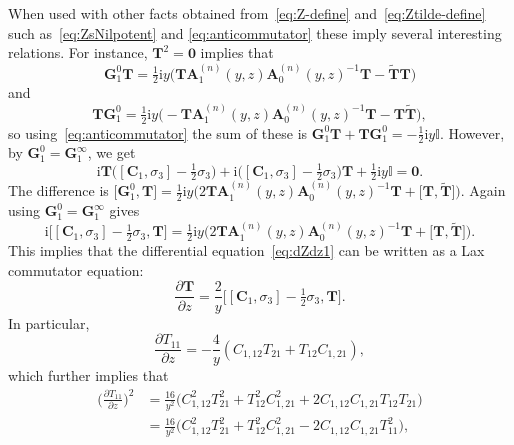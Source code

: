 When used with other facts obtained from~\eqref{eq:Z-define} and~\eqref{eq:Ztilde-define} such as~\eqref{eq:ZsNilpotent} and \eqref{eq:anticommutator}
these imply several interesting relations. For instance, $\mathbf{T}^2=\mathbf{0}$ implies that
\begin{equation*}
\mathbf{G}_1^0\mathbf{T}=\tfrac{1}{2}\mathrm{i} y\bigl(\mathbf{T}\mathbf{A}_1^{(n)}(y,z)\mathbf{A}_0^{(n)}(y,z)^{-1}\mathbf{T}-\widetilde{\mathbf{T}}\mathbf{T}\bigr)
\end{equation*}
and
\begin{equation*}
\mathbf{T}\mathbf{G}_1^0=\tfrac{1}{2}\mathrm{i} y\bigl(-\mathbf{T}\mathbf{A}_1^{(n)}(y,z)\mathbf{A}_0^{(n)}(y,z)^{-1}\mathbf{T}-\mathbf{T}\widetilde{\mathbf{T}}\bigr),
\end{equation*}
so using~\eqref{eq:anticommutator} the sum of these is $\mathbf{G}_1^0\mathbf{T}+\mathbf{T}\mathbf{G}_1^0=-\tfrac{1}{2}\mathrm{i} y\mathbb{I}$. However, by $\mathbf{G}_1^0=\mathbf{G}_1^\infty$, we get
\begin{equation}
\mathrm{i}\mathbf{T}\bigl([\mathbf{C}_1,\sigma_3]-\tfrac{1}{2}\sigma_3\bigr)+\mathrm{i}\bigl([\mathbf{C}_1,\sigma_3]-\tfrac{1}{2}\sigma_3\bigr)\mathbf{T}+\tfrac{1}{2}\mathrm{i} y\mathbb{I}=\mathbf{0}.
\label{eq:one-identity}
\end{equation}
The difference is $\big[\mathbf{G}_1^0,\mathbf{T}\big] = \tfrac{1}{2}\mathrm{i} y\bigl(2\mathbf{T}\mathbf{A}_1^{(n)}(y,z)\mathbf{A}_0^{(n)}(y,z)^{-1}\mathbf{T}+\big[\mathbf{T},\widetilde{\mathbf{T}}\big]\bigr)$. Again using $\mathbf{G}_1^0=\mathbf{G}_1^\infty$ gives
\begin{equation*}
\mathrm{i}\big[[\mathbf{C}_1,\sigma_3]-\tfrac{1}{2}\sigma_3,\mathbf{T}\big]=\tfrac{1}{2}\mathrm{i} y\bigl(2\mathbf{T}\mathbf{A}_1^{(n)}(y,z)\mathbf{A}_0^{(n)}(y,z)^{-1}\mathbf{T}+\big[\mathbf{T},\widetilde{\mathbf{T}}\big]\bigr).
\end{equation*}
This implies that the differential equation~\eqref{eq:dZdz1} can be written as a Lax commutator equation:
\begin{equation*}
\frac{\partial\mathbf{T}}{\partial z}=\frac{2}{y}\big[[\mathbf{C}_1,\sigma_3]-\tfrac{1}{2}\sigma_3,\mathbf{T}\big].
\label{eq:dZdz2}
\end{equation*}
In particular,
\begin{equation*}
\frac{\partial T_{11}}{\partial z}=-\frac{4}{y}(C_{1,12}T_{21}+T_{12}C_{1,21}),
\label{eq:dZ11dz}
\end{equation*}
which further implies that
\begin{align}
\bigg(\frac{\partial T_{11}}{\partial z}\bigg)^2 &= \frac{16}{y^2}\bigl(C_{1,12}^2T_{21}^2 + T_{12}^2C_{1,21}^2 + 2C_{1,12}C_{1,21}T_{12}T_{21}\bigr) \nonumber\\
&=\frac{16}{y^2}\bigl(C_{1,12}^2T_{21}^2 + T_{12}^2C_{1,21}^2-2C_{1,12}C_{1,21}T_{11}^2\bigr),\label{eq:FirstOrderSecondDegree1}
\end{align}
